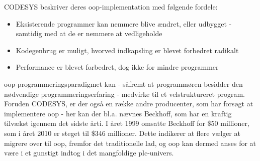 
\noindent CODESYS beskriver deres \gls{oop}-implementation med følgende fordele\cite{codesys-oop-benefits}:
\begin{itemize}
\item Eksisterende programmer kan nemmere blive ændret, eller udbygget - samtidig med at de er nemmere at vedligeholde
\item Kodegenbrug er muligt, hvorved indkapsling er blevet forbedret radikalt
\item Performance er blevet forbedret, dog ikke for mindre programmer
\end{itemize}

\noindent\gls{oop}-programmeringsparadigmet kan - såfremt at programmøren besidder den nødvendige programmeringserfaring - medvirke til et velstruktureret program. Foruden CODESYS, er der også en række andre producenter, som har forsøgt at implementere \gls{oop} - her kan der bl.a. nævnes Beckhoff, som har en kraftig tilvækst igennem det sidste årti. I året 1999 omsatte Beckhoff for \$50 millioner, som i året 2010 er steget til \$346 millioner. Dette indikerer at flere vælger at migrere over til \gls{oop}, fremfor det traditionelle \gls{lad}, og \gls{oop} kan dermed anses for at være i et gunstigt indtog i det mangfoldige \gls{plc}-univers\cite{beckhoff-sold}.





















